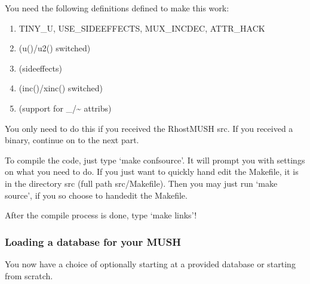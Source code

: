 \documentclass[letterpaper,10pt,english]{sphinxmanual}
\begin{document}
\sphinxAtStartPar
You need the following definitions defined to make this work:
\begin{enumerate}
%
\item {} 
\sphinxAtStartPar
TINY\_U, USE\_SIDEEFFECTS, MUX\_INCDEC, ATTR\_HACK

\item {} 
\sphinxAtStartPar
(u()/u2() switched)

\item {} 
\sphinxAtStartPar
(sideeffects)

\item {} 
\sphinxAtStartPar
(inc()/xinc() switched)

\item {} 
\sphinxAtStartPar
(support for \_/\textasciitilde{} attribs)

\end{enumerate}

\sphinxAtStartPar
You only need to do this if you received the RhostMUSH src.  If you received a binary, continue on to the next part.

\sphinxAtStartPar
To compile the code, just type ‘make confsource’.  It will prompt you with settings on what you need to do.  If you just want to quickly hand edit the Makefile, it is in the directory src (full path src/Makefile).  Then you may just run ‘make source’, if you so choose to hand\sphinxhyphen{}edit the Makefile.

\sphinxAtStartPar
After the compile process is done, type ‘make links’!


\subsubsection{Loading a database for your MUSH}
\label{\detokenize{installation:loading-a-database-for-your-mush}}
\sphinxAtStartPar
You now have a choice of optionally starting at a provided database or starting from scratch.
\end{document}
